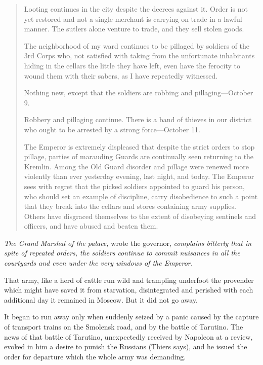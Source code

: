 \begin{quote} \calli Looting continues in the city despite the
decrees against it. Order is not yet restored and not a single
merchant is carrying on trade in a lawful manner. The sutlers
alone venture to trade, and they sell stolen goods.

  The neighborhood of my ward continues to be pillaged by
soldiers of the 3rd Corps who, not satisfied with taking from the
unfortunate inhabitants hiding in the cellars the little they
have left, even have the ferocity to wound them with their
sabers, as I have repeatedly witnessed.

  Nothing new, except that the soldiers are robbing and
pillaging---October 9.

  Robbery and pillaging continue. There is a band of thieves in
our district who ought to be arrested by a strong force---October
11.

  The Emperor is extremely displeased that despite the strict
orders to stop pillage, parties of marauding Guards are
continually seen returning to the Kremlin. Among the Old Guard
disorder and pillage were renewed more violently than ever
yesterday evening, last night, and today. The Emperor sees with
regret that the picked soldiers appointed to guard his person,
who should set an example of discipline, carry disobedience to
such a point that they break into the cellars and stores
containing army supplies. Others have disgraced themselves to the
extent of disobeying sentinels and officers, and have abused and
beaten them.  \end{quote}

\emph{The Grand Marshal of the palace,} wrote the
governor, \emph{complains bitterly that in spite of
repeated orders, the soldiers continue to commit nuisances in all
the courtyards and even under the very windows of the Emperor.}

That army, like a herd of cattle run wild and trampling underfoot
the provender which might have saved it from starvation,
disintegrated and perished with each additional day it remained
in Moscow. But it did not go away.

It began to run away only when suddenly seized by a panic caused
by the capture of transport trains on the Smolensk road, and by
the battle of Tarutino. The news of that battle of Tarutino,
unexpectedly received by Napoleon at a review, evoked in him a
desire to punish the Russians (Thiers says), and he issued the
order for departure which the whole army was demanding.

